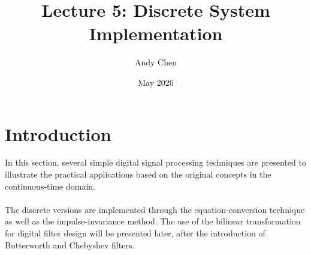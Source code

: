 \documentclass{article}
\title{Lecture 5: Discrete System Implementation}
\author{Andy Chen}
\date{May 2026}
\begin{document}
\maketitle

\section{Introduction}
In this section, several simple digital signal processing techniques are presented to illustrate the practical applications based on the original concepts in the continuous-time domain.
\\
\\
The discrete versions are implemented through the equation-conversion technique as well as the impulse-invariance method. The use of the bilinear transformation for digital filter design will be presented later, after the introduction of Butterworth and Chebyshev filters.
\end{document}
